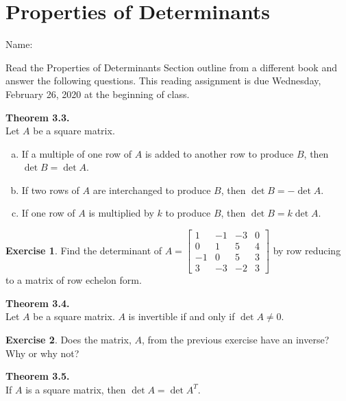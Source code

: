 \documentclass[10pt]{book}
\newcommand{\boxcolor}{gray!30}
\newenvironment{boxthm}{\begin{mdframed}[backgroundcolor=\boxcolor,nobreak=true]}{\end{mdframed}}
\theoremstyle{definition}
\newtheorem{exercise}{Exercise}[section]
\newcommand{\name}[1][2.5in]{\vspace{-2.3em}\hfill Name: \underline{\hspace{#1}}}
\begin{document}
\newpage

\section{Properties of Determinants}
\name

Read the Properties of Determinants Section outline from a different book and answer the following questions.  This reading assignment is due Wednesday, February 26, 2020 at the beginning of class.
\begin{boxthm}
	\textbf{Theorem 3.3.} \\
	Let $A$ be a square matrix.
	\begin{enumerate}[(a)]
		\item If a multiple of one row of $A$ is added to another row to produce $B$, then $\det B = \det A$.
		\item If two rows of $A$ are interchanged to produce $B$, then $\det B = -\det A$.
		\item If one row of $A$ is multiplied by $k$ to produce $B$, then $\det B = k\det A$.
	\end{enumerate}
\end{boxthm}

\begin{exercise} %
	Find the determinant of $A=\begin{bmatrix}1&-1&-3&0\\0&1&5&4\\-1&0&5&3\\3&-3&-2&3\end{bmatrix}$ by row reducing to a matrix of row echelon form.
\end{exercise}
\vfill

\begin{boxthm}
	\textbf{Theorem 3.4.} \\
	Let $A$ be a square matrix. $A$ is invertible if and only if $\det A \ne 0$.
\end{boxthm}

\begin{exercise}
Does the matrix, $A$, from the previous exercise have an inverse? Why or why not?
\end{exercise}

\vspace{2cm}

\newpage

\begin{boxthm}
	\textbf{Theorem 3.5.} \\
	If $A$ is a square matrix, then $\det A = \det A^T$.
\end{boxthm}
\end{document}
